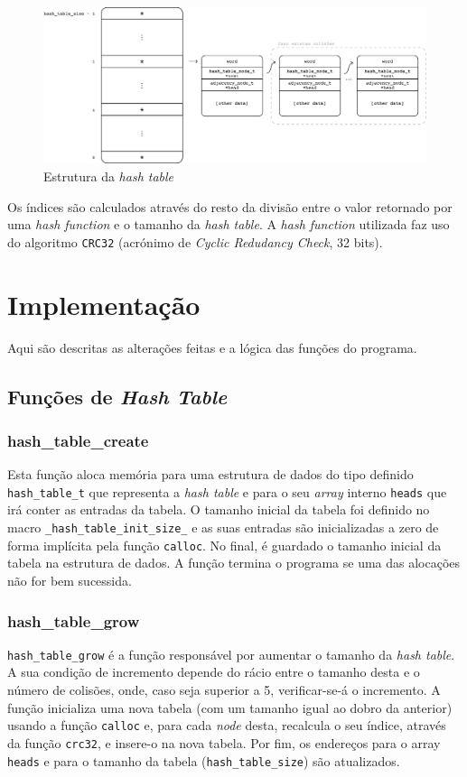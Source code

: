 \documentclass[portuguese,11pt,a4paper,titlepage]{article}
\newcommand{\foreign}[1]{\textit{#1}}
\begin{document}
\begin{figure}[h]
	\centering
	\includegraphics[width=\textwidth]{assets/hash_table-structure.pdf}
	\caption{Estrutura da \textit{hash table}}
	\label{fig:hash_table}
\end{figure}

Os índices são calculados através do resto da divisão entre o valor retornado por uma \textit{hash function} e o tamanho da \textit{hash table}. A \textit{hash function} utilizada faz uso do algoritmo \verb|CRC32| (acrónimo de \textit{Cyclic Redudancy Check}, 32 bits).

\section{Implementação}
Aqui são descritas as alterações feitas e a lógica das funções do programa.

\subsection{Funções de \textit{Hash Table}}

\subsubsection{hash\_table\_create}
Esta função aloca memória para uma estrutura de dados do tipo definido \verb|hash_table_t| que
representa a \foreign{hash table} e para o seu \foreign{array} interno \verb|heads| que irá
conter as entradas da tabela. O tamanho inicial da tabela foi definido no macro
\verb|_hash_table_init_size_| e as suas entradas são inicializadas a zero de forma implícita pela
função \verb|calloc|. No final, é guardado o tamanho inicial da tabela na estrutura de dados. A função termina o programa se uma das alocações não for bem sucessida.

\subsubsection{hash\_table\_grow}
\verb|hash_table_grow| é a função responsável por aumentar o tamanho da \foreign{hash table}. A sua condição de incremento depende do rácio entre o tamanho desta e o número de colisões, onde, caso seja superior a 5, verificar-se-á o incremento. A função inicializa uma nova tabela (com um tamanho igual ao dobro da anterior) usando a função \verb|calloc| e, para cada \textit{node} desta, recalcula o seu índice, através da função \verb|crc32|, e insere-o na nova tabela. Por fim, os endereços para o array \verb|heads| e para o tamanho da tabela (\verb|hash_table_size|) são atualizados.
\end{document}
